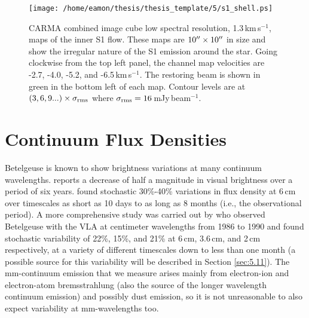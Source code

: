 \begin{figure}[!t]
\centering 
\texttt{[image: /home/eamon/thesis/thesis\_template/5/s1\_shell.ps]}
\caption[CARMA maps of the inner S1 flow]{CARMA combined image cube low spectral resolution, 1.3\,km\,s$^{-1}$, maps of the inner S1 flow. These maps are $10^{\prime\prime} \times 10^{\prime\prime}$ in size and show the irregular nature of the S1 emission around the star. Going clockwise from the top left panel, the channel map velocities are -2.7, -4.0, -5.2, and -6.5\,km\,s$^{-1}$. The restoring beam is shown in green in the bottom left of each map. Contour levels are at $(3,6,9...)\times \sigma _{\rm{rms}}$ where $\sigma _{\rm{rms}} = 16$\,mJy\,beam$^{-1}$.}
\label{fig:5.12a}
\end{figure}

\section{Continuum Flux Densities}\label{sec:5.9}
Betelgeuse is known to show brightness variations at many continuum wavelengths. \cite{goldberg_1984} reports a decrease of half a magnitude in visual brightness over a period of six years. \cite{bookbinder_1987} found stochastic 30\%-40\% variations in flux density at 6\,cm over timescales as short as 10 days to as long as 8 months (i.e., the observational period). A more comprehensive study was carried out by \cite{drake_1992} who observed Betelgeuse with the VLA at centimeter wavelengths from 1986 to 1990 and found stochastic variability of 22\%, 15\%, and 21\% at 6\,cm, 3.6\,cm, and 2\,cm respectively, at a variety of different timescales down to less than one month (a possible source for this variability will be described in Section \ref{sec:5.11}). The mm-continuum emission that we measure arises mainly from electron-ion and electron-atom bremsstrahlung (also the source of the longer wavelength continuum emission) and possibly dust emission, so it is not unreasonable to also expect variability at mm-wavelengths too. 

